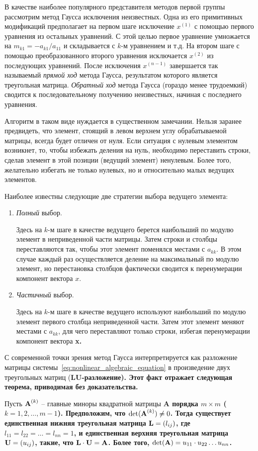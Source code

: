 В качестве наиболее популярного представителя методов первой группы рассмотрим метод Гаусса исключения неизвестных. Одна
из его примитивных модификаций предполагает на первом шаге исключение $\displaystyle x^{(1)}$ с помощью первого уравнения
из остальных уравнений. С этой целью первое уравнение умножается на $m_{k1} = -a_{k1}/a_{11}$ и складывается с $k$-м
уравнением и т.д. На втором шаге с помощью преобразованного второго уравнения исключается
$\displaystyle x^{(2)}$ из последующих уравнений. После исключения $\displaystyle x^{(n-1)}$ завершается так называемый
\emph{прямой ход} метода Гаусса, результатом которого является треугольная матрица. \emph{Обратный ход} метода Гаусса
(гораздо менее трудоемкий) сводится к последовательному получению неизвестных, начиная с последнего уравнения.

Алгоритм в таком виде нуждается в существенном замечании. Нельзя заранее предвидеть, что элемент, стоящий в левом верхнем
углу обрабатываемой матрицы, всегда будет отличен от нуля. Если ситуация с нулевым элементом возникнет, то, чтобы
избежать деления на нуль, необходимо переставить строки, сделав элемент в этой позиции (ведущий элемент) ненулевым.
Более того, желательно избегать не только нулевых, но и относительно малых ведущих элементов.

Наиболее известны следующие две стратегии выбора ведущего элемента:
\begin{enumerate}
    \item \emph{Полный} выбор.

    Здесь на $k$-м шаге в качестве ведущего берется наибольший по модулю элемент в неприведенной части матрицы. Затем
    строки и столбцы переставляются так, чтобы этот элемент поменялся местами с $a_{kk}$. В этом случае каждый раз
    осуществляется деление на максимальный по модулю элемент, но перестановка столбцов фактически сводится к
    перенумерации компонент вектора $x$.

    \item \emph{Частичный} выбор.

    Здесь на $k$-м шаге в качестве ведущего используют наибольший по модулю элемент первого столбца неприведенной
    части. Затем этот элемент меняют местами с $a_{kk}$, для чего переставляют только строки, избегая перенумерации
    компонент вектора \bf{x}.
\end{enumerate}

С современной точки зрения метод Гаусса интерпретируется как разложение матрицы системы~\eqref{eq:nonlinear_algebraic_equation}
в произведение двух треугольных матриц (\bf{LU}-разложение). Этот факт отражает следующая теорема, приводимая без
доказательства.
\begin{theorem}
    Пусть $\displaystyle \bf{A}^{(k)}$ -- главные миноры квадратной матрицы \bf{A} порядка $m \times m$ ($k=1,2,\dots,m-1$).
    Предположим, что $\det(\bf{A}^{(k)}) \neq 0$. Тогда существует единственная нижняя треугольная матрица
    $\bf{L} = (l_{ij})$, где $l_{11} = l_{22} = \dots = l_{nn} = 1$, и единственная верхняя треугольная матрица
    $\bf{U} = (u_{ij})$, такие, что $\bf{L} \cdot \bf{U} = \bf{A}$. Более того, $\det(\bf{A}) = u_{11} \cdot u_{22} \dots u_{nn}$.
\end{theorem}


